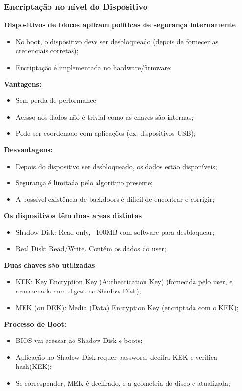\documentclass{article}
\begin{document}
\subsubsection{Encriptação no nível do Dispositivo}

\begin{flushleft}
  \textbf{Dispositivos de blocos aplicam politicas de segurança internamente}
  \begin{itemize}
    \item No boot, o dispositivo deve ser desbloqueado (depois de fornecer as credenciais corretas);
    \item Encriptação é implementada no hardware/firmware;
  \end{itemize}

  \pagebreak

  \textbf{Vantagens:}
  \begin{itemize}
    \item Sem perda de performance;
    \item Acesso aos dados não é trivial como as chaves são internas;
    \item Pode ser coordenado com aplicações (ex: dispositivos USB);
  \end{itemize}

  \textbf{Desvantagens:}
  \begin{itemize}
    \item Depois do dispositivo ser desbloqueado, os dados estão disponíveis;
    \item Segurança é limitada pelo algoritmo presente;
    \item A possível existência de backdoors é dificil de encontrar e corrigir;
  \end{itemize}

  \textbf{Os dispositivos têm duas areas distintas}
  \begin{itemize}
    \item Shadow Disk: Read-only, ~100MB com software para desbloquear;
    \item Real Disk: Read/Write. Contém os dados do user;
  \end{itemize}

  \textbf{Duas chaves são utilizadas}
  \begin{itemize}
    \item KEK: Key Encryption Key (Authentication Key) (fornecida
    pelo user, e armazenada com digest no Shadow Disk);
    \item MEK (ou DEK): Media (Data) Encryption Key (encriptada com o KEK);
  \end{itemize}

  \textbf{Processo de Boot:}
  \begin{itemize}
    \item BIOS vai acessar ao Shadow Disk e boots;
    \item Aplicação no Shadow Disk requer password, decifra KEK e verifica hash(KEK);
    \item Se corresponder, MEK é decifrado, e a geometria do disco é atualizada;
  \end{itemize}
\end{flushleft}

\pagebreak
\end{document}
